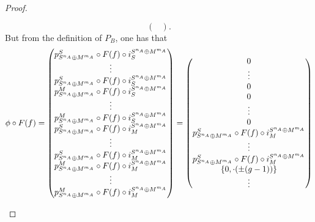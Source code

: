 \begin{proof}
\begin{enumerate}
{\[\begin{pmatrix}
                \end{pmatrix}.
            \]
            But from the definition of \( P_B \), one has that
            \[
                \phi \circ F(f) = \begin{pmatrix}
                     p_{S^{n_A} \oplus M^{m_A}}^S \circ F(f) \circ i_S^{S^{n_A} \oplus M^{m_A}} \\
                    \vdots \\
                    p_{S^{n_A} \oplus M^{m_A}}^S \circ F(f) \circ i_S^{S^{n_A} \oplus M^{m_A}} \\
                    p_{S^{n_A} \oplus M^{m_A}}^M \circ F(f) \circ i_S^{S^{n_A} \oplus M^{m_A}} \\
                    \vdots \\
                    p_{S^{n_A} \oplus M^{m_A}}^M \circ F(f) \circ i_S^{S^{n_A} \oplus M^{m_A}} \\
                    p_{S^{n_A} \oplus M^{m_A}}^S \circ F(f) \circ i_M^{S^{n_A} \oplus M^{m_A}} \\
                    \vdots \\
                    p_{S^{n_A} \oplus M^{m_A}}^S \circ F(f) \circ i_M^{S^{n_A} \oplus M^{m_A}} \\
                    p_{S^{n_A} \oplus M^{m_A}}^M \circ F(f) \circ i_M^{S^{n_A} \oplus M^{m_A}} \\
                    \vdots \\
                    p_{S^{n_A} \oplus M^{m_A}}^M \circ F(f) \circ i_M^{S^{n_A} \oplus M^{m_A}}
                \end{pmatrix}
                = \begin{pmatrix}
                    0 \\
                    \vdots \\
                    0 \\
                    0 \\
                    \vdots \\
                    0 \\
                    p_{S^{n_A} \oplus M^{m_A}}^S \circ F(f) \circ i_M^{S^{n_A} \oplus M^{m_A}} \\
                    \vdots \\
                    p_{S^{n_A} \oplus M^{m_A}}^S \circ F(f) \circ i_M^{S^{n_A} \oplus M^{m_A}} \\
                    \left\{ 0, \cdot(\pm(g - 1)) \right\} \\
                    \vdots \\

\end{pmatrix}\]}
\end{enumerate}
\end{proof}
